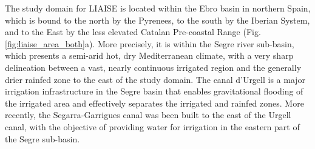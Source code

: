 The study domain for LIAISE is located within the Ebro basin in northern Spain, which is bound to the north by the Pyrenees, to the south by the Iberian System, and to the East by the less elevated Catalan Pre-coastal Range (Fig. \ref{fig:liaise_area_both}a). More precisely, it is within the Segre river sub-basin, which presents a semi-arid hot, dry  Mediterranean climate, with a very sharp delineation between a vast, nearly continuous irrigated region and the generally drier rainfed zone to the east of the study domain. The canal d'Urgell is a major irrigation infrastructure in the Segre basin that enables gravitational flooding of the irrigated area and effectively separates the irrigated and rainfed zones.
More recently, the Segarra-Garrigues canal was been built to the east of the Urgell canal, with the objective of providing water for irrigation in the eastern part of the Segre sub-basin.

